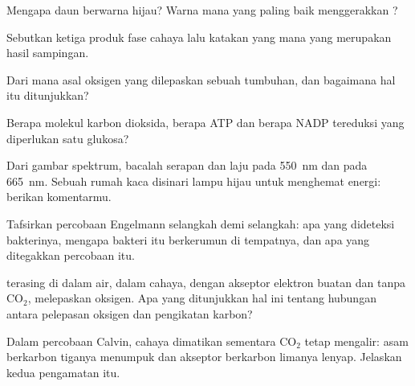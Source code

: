 \begin{exercise}[$\star$]\label{exo:g12:photosynthesis:2}
Mengapa daun berwarna hijau? Warna mana yang paling baik menggerakkan
?
\end{exercise}

\begin{exercise}[$\star$]\label{exo:g12:photosynthesis:3}
Sebutkan ketiga produk fase cahaya lalu katakan yang mana yang
merupakan hasil sampingan.
\end{exercise}

\begin{exercise}[$\star$]\label{exo:g12:photosynthesis:4}
Dari mana asal oksigen yang dilepaskan sebuah tumbuhan, dan bagaimana
hal itu ditunjukkan?
\end{exercise}

\begin{exercise}[$\star$]\label{exo:g12:photosynthesis:5}
Berapa molekul karbon dioksida, berapa ATP dan berapa NADP tereduksi
yang diperlukan satu glukosa?
\end{exercise}

\begin{exercise}[$\star\star$]\label{exo:g12:photosynthesis:6}
Dari gambar spektrum, bacalah serapan dan laju  pada
\qty{550}{nm} dan pada \qty{665}{nm}. Sebuah rumah kaca disinari lampu
hijau untuk menghemat energi: berikan komentarmu.
\end{exercise}

\begin{exercise}[$\star\star$]\label{exo:g12:photosynthesis:7}
Tafsirkan percobaan Engelmann selangkah demi selangkah: apa yang
dideteksi bakterinya, mengapa bakteri itu berkerumun di tempatnya, dan
apa yang ditegakkan percobaan itu.
\end{exercise}

\begin{exercise}[$\star\star$]\label{exo:g12:photosynthesis:8}
 terasing di dalam air, dalam cahaya, dengan akseptor
elektron buatan dan tanpa $\mathrm{CO_2}$, melepaskan oksigen. Apa yang
ditunjukkan hal ini tentang hubungan antara pelepasan oksigen dan
pengikatan karbon?
\end{exercise}

\begin{exercise}[$\star\star$]\label{exo:g12:photosynthesis:9}
Dalam percobaan Calvin, cahaya dimatikan sementara $\mathrm{CO_2}$
tetap mengalir: asam berkarbon tiganya menumpuk dan akseptor berkarbon
limanya lenyap. Jelaskan kedua pengamatan itu.
\end{exercise}

